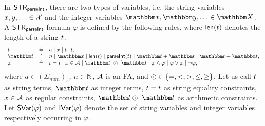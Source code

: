 In ${\sf STR}_{\textsf{parseInt}}$, there are two types of variables, i.e. the string variables $x,y,\ldots \in \mathcal{X}$ and the integer variables $\ivarx,\ivary,\ldots \in \ivars$.
%
A ${\sf STR}_{\textsf{parseInt}}$ formula $\varphi$ is defined by the following rules, where $\textsf{len}(t)$ denotes the length of a string $t$.
\[
\begin{array}{l c l}
\sterm & \Def & a \mid \svarx \mid \sterm \concat \sterm, \\
\iterm & \Def & n \mid \ivarx \mid \len(\sterm) \mid \parseInt(\sterm) \mid \iterm + \iterm \mid \iterm - \iterm,\\
\varphi & \Def & \sterm = \sterm \mid x \in \Aut \mid \iterm\ \op\ \iterm \mid \varphi \wedge \varphi \mid \varphi \vee \varphi \mid \neg \varphi,
\end{array}
\]
where $a \in (\Sigma_{\textit{num}})_\varepsilon$, $n \in \mathbb{N}$, $\mathcal{A}$ is an FA, and $\odot \in \{=, < , >, \le, \ge\}$. Let us call $t$ as string terms, $\iterm$ as integer terms, $t = t$ as string equality constraints, $x \in \mathcal{A}$ as regular constraints, $\iterm \op\ \iterm$ as arithmetic constraints. 
Let  $\textsf{SVar}(\varphi)$ and $\textsf{IVar}(\varphi)$ denote the set of string variables and integer variables respectively occurring in $\varphi$.


